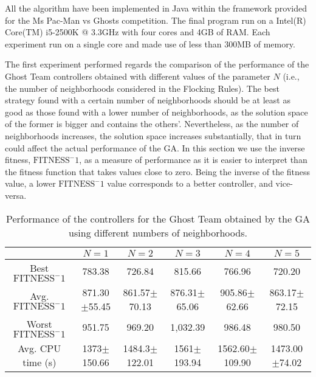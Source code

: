 \documentclass[a4paper]{llncs}
\begin{document}
All the algorithm have been implemented in Java within the framework provided for the Ms Pac-Man vs Ghosts competition. The final program run on a Intel(R) Core(TM) i5-2500K @ 3.3GHz with four cores and 4GB of RAM. Each experiment run on a single core and made use of less than 300MB of memory.


The first experiment performed regards the comparison of the performance of the Ghost Team controllers obtained with different values of the parameter $N$ (i.e., the number of neighborhoods considered in the Flocking Rules). The best strategy found with a certain number of neighborhoods should be at least as good as those found with a lower number of neighborhoods, as the solution space of the former is bigger and contains the others'. Nevertheless, as the number of neighborhoods increases, the solution space increases substantially, that in turn could affect the actual performance of the GA. In this section we use the inverse fitness, $\mathrm{FITNESS}^-1$, as a measure of performance as it is easier to interpret than the fitness function that takes values close to zero. Being the inverse of the fitness value, a lower $\mathrm{FITNESS}^-1$ value corresponds to a better controller, and vice-versa. 

\begin{small}
\begin{table} [htbp]
\centering
{
\begin{tabular}{|c||c|c|c|c|c|}
\hline & $N = 1$ & $N = 2$ & $N = 3$ & $N = 4$ & $N = 5$ \\
\hline
Best $\mathrm{FITNESS}^-1$& 783.38 & 726.84 & 815.66 & 766.96 & 720.20 \\
\hline
Avg. $\mathrm{FITNESS}^-1$& 871.30$\pm$55.45 & 861.57$\pm$70.13 & 876.31$\pm$65.06 & 905.86$\pm$62.66 & 863.17$\pm$72.15 \\
\hline
Worst $\mathrm{FITNESS}^-1$ & 951.75 & 969.20 & 1,032.39 & 986.48 & 980.50 \\
\hline
Avg. CPU time (s)& 1373$\pm$150.66 & 1484.3$\pm$122.01 & 1561$\pm$193.94 & 1562.60$\pm$109.90 & 1473.00$\pm$74.02 \\
\hline
\end{tabular}}
\caption{Performance of the controllers for the Ghost Team obtained by the GA using different numbers of neighborhoods.
\label{tab:results_GA}}
\end{table}
\end{small}
\end{document}
